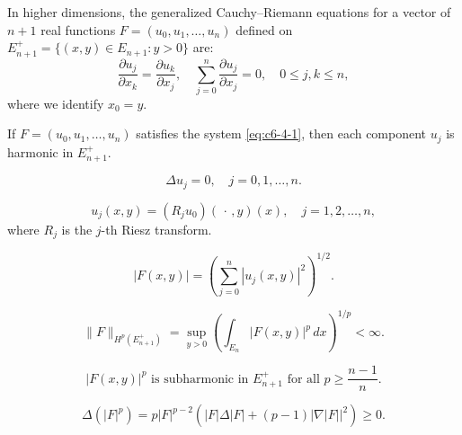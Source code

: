 In higher dimensions, the generalized Cauchy--Riemann equations for a vector of $n+1$ real functions $F = (u_0, u_1, \dots, u_n)$ defined on $E_{n+1}^+ = \{(x, y) \in E_{n+1} : y > 0\}$ are:
\begin{equation}\label{eq:c6-4-1}
\frac{\partial u_j}{\partial x_k} = \frac{\partial u_k}{\partial x_j}, \quad \sum_{j=0}^n \frac{\partial u_j}{\partial x_j} = 0, \quad 0 \leq j, k \leq n,
\end{equation}
where we identify $x_0 = y$.

\begin{theorem}\label{thm:c6-4-2}
If $F = (u_0, u_1, \dots, u_n)$ satisfies the system \eqref{eq:c6-4-1}, then each component $u_j$ is harmonic in $E_{n+1}^+$.
\end{theorem}

\begin{equation}\label{eq:c6-4-3}
\Delta u_j = 0, \quad j = 0, 1, \dots, n.
\end{equation}

\begin{equation}\label{eq:c6-4-4}
u_j(x, y) = (R_j u_0)(\,\cdot\,, y)(x), \quad j = 1, 2, \dots, n,
\end{equation}
where $R_j$ is the $j$-th Riesz transform.

\begin{equation}\label{eq:c6-4-5}
|F(x, y)| = \left( \sum_{j=0}^n |u_j(x, y)|^2 \right)^{1/2}.
\end{equation}

\begin{equation}\label{eq:c6-4-6}
\|F\|_{H^p(E_{n+1}^+)} = \sup_{y > 0} \left( \int_{E_n} |F(x, y)|^p\,dx \right)^{1/p} < \infty.
\end{equation}

\begin{equation}\label{eq:c6-4-7}
|F(x, y)|^p \text{ is subharmonic in } E_{n+1}^+ \text{ for all } p \geq \frac{n-1}{n}.
\end{equation}

\begin{equation}\label{eq:c6-4-8}
\Delta(|F|^p) = p |F|^{p-2} \left( |F| \Delta|F| + (p-1) |\nabla |F||^2 \right) \geq 0.
\end{equation}

